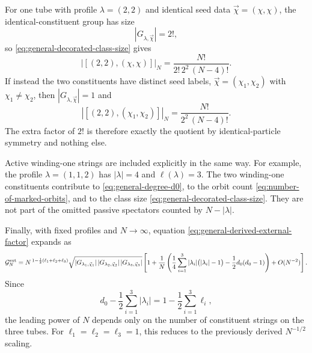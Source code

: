 \documentclass[11pt]{article}
\newcommand{\mc}[1]{\mathcal{#1}}
\begin{document}
For one tube with profile $\lambda=(2,2)$ and identical seed data $\vec\chi=(\chi,\chi)$, the identical-constituent group has size
\[
|G_{\lambda,\vec\chi}|=2!,
\]
so \eqref{eq:general-decorated-class-size} gives
\[
|[(2,2),(\chi,\chi)]|_N
=
\frac{N!}{2!\,2^2\,(N-4)!}.
\]
If instead the two constituents have distinct seed labels, $\vec\chi=(\chi_1,\chi_2)$ with $\chi_1\neq \chi_2$, then $|G_{\lambda,\vec\chi}|=1$ and
\[
|[(2,2),(\chi_1,\chi_2)]|_N
=
\frac{N!}{2^2\,(N-4)!}.
\]
The extra factor of $2!$ is therefore exactly the quotient by identical-particle symmetry and nothing else.

Active winding-one strings are included explicitly in the same way. For example, the profile $\lambda=(1,1,2)$ has $|\lambda|=4$ and $\ell(\lambda)=3$. The two winding-one constituents contribute to \eqref{eq:general-degree-d0}, to the orbit count \eqref{eq:number-of-marked-orbits}, and to the class size \eqref{eq:general-decorated-class-size}. They are not part of the omitted passive spectators counted by $N-|\lambda|$.

Finally, with fixed profiles and $N\to\infty$, equation \eqref{eq:general-derived-external-factor} expands as
\begin{equation}\label{eq:general-large-n-expansion}
\mc G_N^{\rm ext}
=
N^{\,1-\frac12(\ell_1+\ell_2+\ell_3)}
\sqrt{
|G_{\lambda_1,\vec\chi_1}|\,
|G_{\lambda_2,\vec\chi_2}|\,
|G_{\lambda_3,\vec\chi_3}|
}
\left[
1+\frac{1}{N}
\left(
\frac14\sum_{i=1}^3 |\lambda_i|\bigl(|\lambda_i|-1\bigr)
-\frac12 d_0(d_0-1)
\right)
+O(N^{-2})
\right].
\end{equation}
Since
\[
d_0-\frac12\sum_{i=1}^3 |\lambda_i|
=
1-\frac12\sum_{i=1}^3 \ell_i,
\]
the leading power of $N$ depends only on the number of constituent strings on the three tubes. For $\ell_1=\ell_2=\ell_3=1$, this reduces to the previously derived $N^{-1/2}$ scaling.
\end{document}
